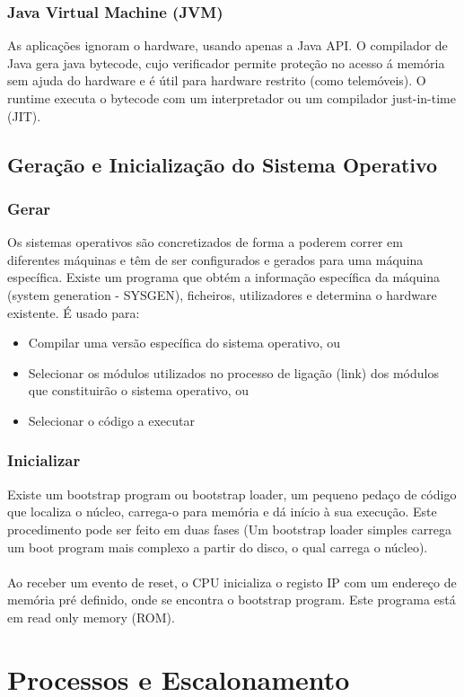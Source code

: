 \documentclass[10pt,a4paper]{report}
\begin{document}
\subsection{Java Virtual Machine (JVM)}
As aplicações ignoram o hardware, usando apenas a Java API. O compilador de Java gera java bytecode, cujo verificador permite proteção no acesso á memória sem ajuda do hardware e é útil para hardware restrito (como telemóveis). O runtime executa o bytecode com um interpretador ou um compilador just-in-time (JIT).
\section{Geração e Inicialização do Sistema Operativo}
\subsection{Gerar}
Os sistemas operativos são concretizados de forma a poderem correr em diferentes máquinas e
têm de ser configurados e gerados para uma máquina específica. Existe um programa que obtém a informação específica da máquina (system generation - SYSGEN), ficheiros, utilizadores e determina o hardware existente. É usado para:
\begin{itemize}
\item Compilar uma versão específica do sistema operativo, ou
\item Selecionar os módulos utilizados no processo de ligação (link) dos módulos que constituirão o sistema operativo, ou
\item Selecionar o código a executar
\end{itemize} 
\subsection{Inicializar}
Existe um bootstrap program ou bootstrap loader, um pequeno pedaço de código que localiza o núcleo, carrega-o para memória e dá início à sua execução. Este procedimento pode ser feito em duas fases (Um bootstrap loader simples carrega um boot program mais complexo a partir do disco, o qual carrega o núcleo).\\
\\
Ao receber um evento de reset, o CPU inicializa o registo IP com um endereço de memória pré definido, onde se encontra o bootstrap program. Este programa está em read only memory (ROM).

\chapter{Processos e Escalonamento}
\end{document}
